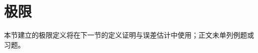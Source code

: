 \par\addvspace{12pt}

\section{极限}

\label{sol:sec:analysis:3}

本节建立的极限定义将在下一节的定义证明与误差估计中使用；正文未单列例题或习题。
